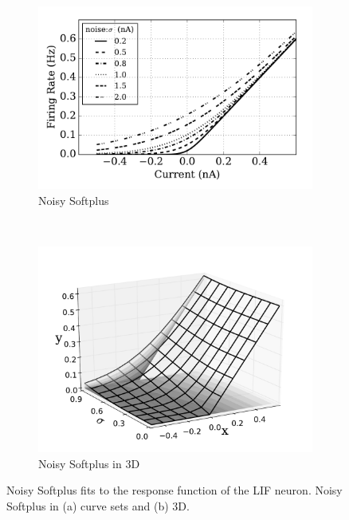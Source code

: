 	\begin{figure}[thb!]
		\centering
		\begin{subfigure}[t]{0.7\textwidth}
			\includegraphics[width=\textwidth]{pics_iconip/4.pdf}
			\caption{Noisy Softplus}
			\label{Fig:nsp}
		\end{subfigure}\\
		\begin{subfigure}[t]{0.7\textwidth}
			\includegraphics[width=\textwidth]{pics_iconip/5.pdf}
			\caption{Noisy Softplus in 3D}
			\label{Fig:3d}
		\end{subfigure}
		\caption{
			Noisy Softplus fits to the response function of the LIF neuron.
			Noisy Softplus in (a) curve sets and (b) 3D.}
		\label{fig:nsp}
	\end{figure}	
	
